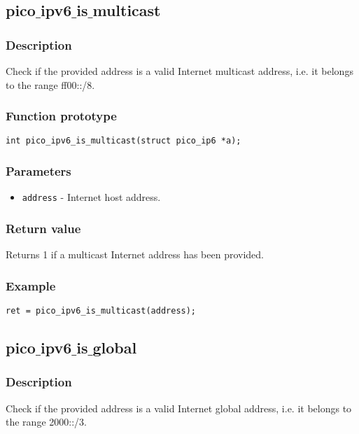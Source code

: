 \subsection{pico$\_$ipv6$\_$is$\_$multicast}
\subsubsection*{Description}
Check if the provided address is a valid Internet multicast address, i.e. it belongs to the range ff00::/8.
\subsubsection*{Function prototype}
\begin{verbatim}
int pico_ipv6_is_multicast(struct pico_ip6 *a);
\end{verbatim}
\subsubsection*{Parameters}
\begin{itemize}[noitemsep]
\item \texttt{address} - Internet host address.
\end{itemize}
\subsubsection*{Return value}
Returns 1 if a multicast Internet address has been provided.
\subsubsection*{Example}
\begin{verbatim}
ret = pico_ipv6_is_multicast(address);
\end{verbatim}

\subsection{pico$\_$ipv6$\_$is$\_$global}

\subsubsection*{Description}
Check if the provided address is a valid Internet global address, i.e. it belongs to the range 2000::/3.

